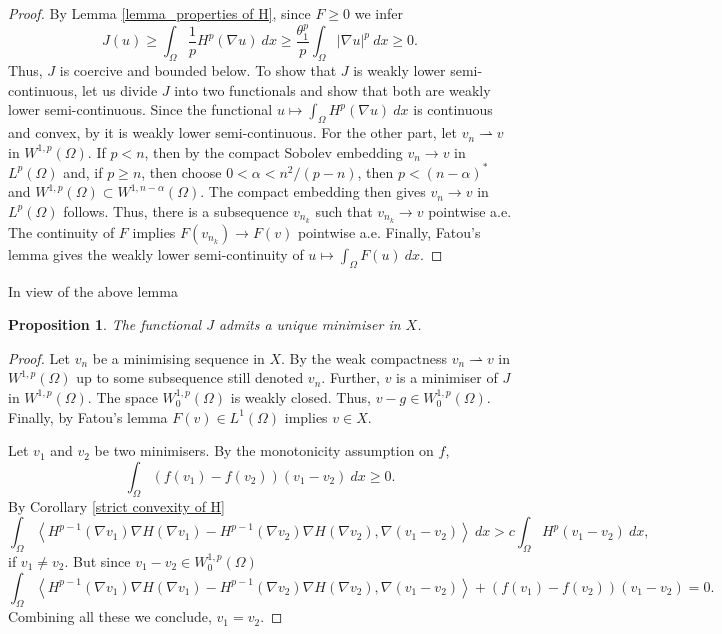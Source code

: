 \documentclass[11pt]{amsart}
\newtheorem{proposition}[theorem]{Proposition}
\newcommand{\Fin}[1]{H^{p-1}(\nabla #1)\nabla H(\nabla #1)}
\numberwithin{equation}{section}
\begin{document}
\begin{proof}
    By Lemma \ref{lemma_properties of H}, since $F\geq 0$ we infer
    \begin{equation*}
        J(u)\geq \int_{\Omega}\frac{1}{p}H^{p}(\nabla u) \ dx\geq \frac{\theta_{1}^{p}}{p}\int_{\Omega}|\nabla u|^{p}\ dx\geq 0.
    \end{equation*}
    Thus, $J$ is coercive and bounded below. To show that $J$ is weakly lower semi-continuous, let us divide $J$ into two functionals and show that both are weakly lower semi-continuous. Since the functional $u\mapsto \int_{\Omega}H^{p}(\nabla u)\ dx$ is continuous and convex, by \cite[Corollary 3.9, Remark 6]{Brezis2011} it is weakly lower semi-continuous. For the other part, let $v_{n}\rightharpoonup v$ in $W^{1,p}(\Omega)$. If $p< n$, then by the compact Sobolev embedding $v_{n}\to v$ in $L^{p}(\Omega)$ and, if $p\geq n$, then choose $0<\alpha<n^{2}/(p-n)$, then $p<(n-\alpha)^{*}$ and $W^{1,p}(\Omega)\subset W^{1,n-\alpha}(\Omega)$. The compact embedding then gives $v_{n}\to v$ in $L^{p}(\Omega)$ follows. Thus, there is a subsequence $v_{n_{k}}$ such that $v_{n_{k}}\to v$ pointwise a.e. The continuity of $F$ implies $F(v_{n_{k}})\to F(v)$ pointwise  a.e. Finally, Fatou's lemma gives the weakly lower semi-continuity of $u\mapsto \int_{\Omega}F(u)\ dx$.
    \end{proof}
      In view of the above lemma
    \begin{proposition}
        The functional $J$ admits a unique minimiser in $X$.
    \end{proposition}
    \begin{proof}
    Let $v_{n}$ be a minimising sequence in $X$. By the weak compactness $v_{n}\rightharpoonup v$ in $W^{1,p}(\Omega)$ up to some subsequence still denoted $v_{n}$. Further, $v$ is a minimiser of $J$ in $W^{1,p}(\Omega)$. The space $W_{0}^{1,p}(\Omega)$ is weakly closed. Thus, $v-g\in W_{0}^{1,p}(\Omega)$. Finally, by Fatou's lemma $F(v)\in L^{1}(\Omega)$ implies $v\in X$. 

    Let $v_{1}$ and $v_{2}$ be two minimisers. 
    By the monotonicity assumption on $f$,
    \begin{equation*}
        \int_{\Omega}\left(f(v_{1})-f(v_{2})\right)(v_{1}-v_{2})\ dx \geq 0.
    \end{equation*}
    By Corollary \ref{strict convexity of H}
    \begin{equation*}
        \int_{\Omega}\left<\Fin{v_{1}}-\Fin{v_{2}}, \nabla (v_{1}-v_{2})\right> \ dx>c \int_{\Omega}H^{p}(v_{1}-v_{2})\ dx,
    \end{equation*}
    if $v_{1}\neq v_{2}$. But since $v_{1}-v_{2}\in W_{0}^{1,p}(\Omega)$
    \begin{equation*}
        \int_{\Omega}\left<\Fin{v_{1}}-\Fin{v_{2}}, \nabla(v_{1}-v_{2})\right> +\left(f(v_{1})-f(v_{2})\right)(v_{1}-v_{2})=0.
    \end{equation*}
    Combining all these we conclude, $v_{1}=v_{2}$.
    \end{proof}
\end{document}
